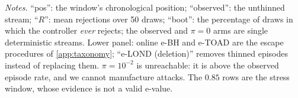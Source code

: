 \begin{table}[t]
\vspace{4pt}
\par\vspace{3pt}
{\footnotesize\raggedright \emph{Notes.} ``pos'': the window's chronological position; ``observed'': the
unthinned stream; ``$R$'': mean rejections over 50 draws; ``boot'': the percentage of draws in
which the controller \emph{ever} rejects; the observed and $\pi=0$ arms are single deterministic
streams. Lower panel: online e-BH and e-TOAD are the escape procedures of \cref{app:taxonomy}; ``e-LOND
(deletion)'' removes thinned episodes instead of replacing them. $\pi=10^{-2}$ is unreachable: it is above the observed episode rate, and
we cannot manufacture attacks. The $0.85$ rows are the stress window, whose evidence is not a valid
e-value.\par}
\end{table}
